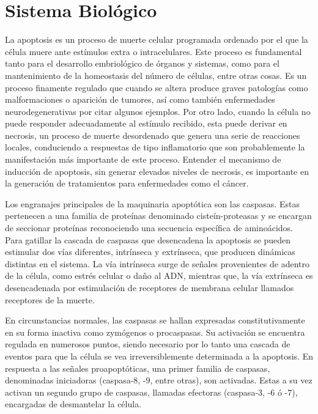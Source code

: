 \section{Sistema Biológico}

La apoptosis es un proceso de muerte celular programada ordenado por el que la célula muere ante estímulos extra o intracelulares. Este proceso es fundamental tanto para el desarrollo embriológico de órganos y sistemas, como para el mantenimiento de la homeostasis del número de células, entre otras cosas. Es un proceso finamente regulado que cuando se altera produce graves patologías como malformaciones o aparición de tumores, así como también enfermedades neurodegenerativas por citar algunos ejemplos\cite{Kominami2012}. Por otro lado, cuando la célula no puede responder adecuadamente al estímulo recibido, esta puede derivar en necrosis, un proceso de muerte desordenado que genera una serie de reacciones locales, conduciendo a respuestas de tipo inflamatorio que son probablemente la manifestación más importante de este proceso. Entender el mecanismo de inducción de apoptosis, sin generar elevados niveles de necrosis, es importante en la generación de tratamientos para enfermedades como el cáncer.

Los engranajes principales de la maquinaria apoptótica son las caspasas. Estas pertenecen a una familia de proteínas denominado cisteín-proteasas y se encargan de seccionar proteínas reconociendo una secuencia específica de aminoácidos. Para gatillar la cascada de caspasas que desencadena la apoptosis se pueden estimular dos vías diferentes, intrínseca y extrínseca, que producen dinámicas distintas en el sistema. La vía intrínseca surge de señales provenientes de adentro de la célula, como estrés celular o daño al ADN, mientras que, la vía extrínseca es desencadenada por estimulación de receptores de membrana celular llamados receptores de la muerte\cite{Sakamaki2012}.

En circunstancias normales, las caspasas se hallan expresadas constitutivamente en su forma inactiva como zymógenos o procaspasas. Su activación se encuentra regulada en numerosos puntos, siendo necesario por lo tanto una cascada de eventos para que la célula se vea irreversiblemente determinada a la apoptosis. En respuesta a las señales proapoptóticas, una primer familia de caspasas, denominadas iniciadoras (caspasa-8, -9, entre otras), son activadas. Estas a su vez activan un segundo grupo de caspasas, llamadas efectoras (caspasa-3, -6 ó -7), encargadas de desmantelar la célula\cite{Varner2000}.

